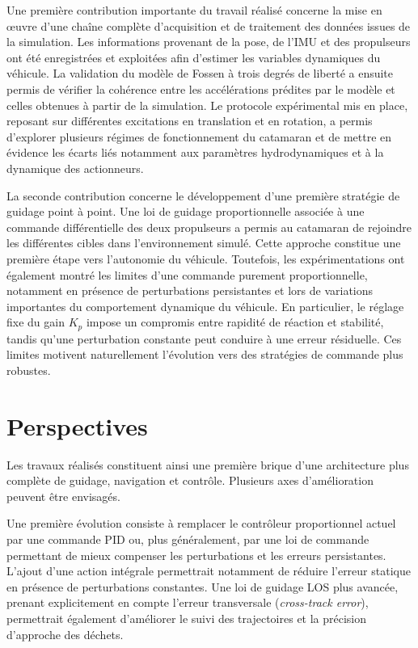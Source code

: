 \documentclass{rapportEILCO}
\begin{document}
	Une première contribution importante du travail réalisé concerne la mise en œuvre d'une chaîne complète d'acquisition et de traitement des données issues de la simulation. Les informations provenant de la pose, de l'IMU et des propulseurs ont été enregistrées et exploitées afin d'estimer les variables dynamiques du véhicule. La validation du modèle de Fossen à trois degrés de liberté a ensuite permis de vérifier la cohérence entre les accélérations prédites par le modèle et celles obtenues à partir de la simulation. Le protocole expérimental mis en place, reposant sur différentes excitations en translation et en rotation, a permis d'explorer plusieurs régimes de fonctionnement du catamaran et de mettre en évidence les écarts liés notamment aux paramètres hydrodynamiques et à la dynamique des actionneurs.
	
	La seconde contribution concerne le développement d'une première stratégie de guidage point à point. Une loi de guidage proportionnelle associée à une commande différentielle des deux propulseurs a permis au catamaran de rejoindre les différentes cibles dans l'environnement simulé. Cette approche constitue une première étape vers l'autonomie du véhicule. Toutefois, les expérimentations ont également montré les limites d'une commande purement proportionnelle, notamment en présence de perturbations persistantes et lors de variations importantes du comportement dynamique du véhicule. En particulier, le réglage fixe du gain $K_p$ impose un compromis entre rapidité de réaction et stabilité, tandis qu'une perturbation constante peut conduire à une erreur résiduelle. Ces limites motivent naturellement l'évolution vers des stratégies de commande plus robustes.
	
	\section{Perspectives}
	
	Les travaux réalisés constituent ainsi une première brique d'une architecture plus complète de guidage, navigation et contrôle. Plusieurs axes d'amélioration peuvent être envisagés.
	

	Une première évolution consiste à remplacer le contrôleur proportionnel actuel par une commande PID ou, plus généralement, par une loi de commande permettant de mieux compenser les perturbations et les erreurs persistantes. L'ajout d'une action intégrale permettrait notamment de réduire l'erreur statique en présence de perturbations constantes. Une loi de guidage LOS plus avancée, prenant explicitement en compte l'erreur transversale (\emph{cross-track error}), permettrait également d'améliorer le suivi des trajectoires et la précision d'approche des déchets.
	
\end{document}
